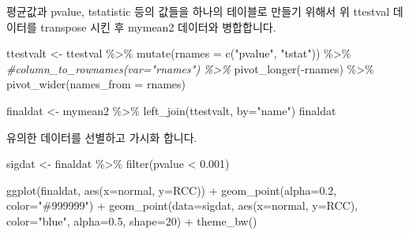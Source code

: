 \documentclass[
]{book}
\newenvironment{Shaded}{\begin{snugshade}}{\end{snugshade}}
\newcommand{\AttributeTok}[1]{\textcolor[rgb]{0.77,0.63,0.00}{#1}}
\newcommand{\CommentTok}[1]{\textcolor[rgb]{0.56,0.35,0.01}{\textit{#1}}}
\newcommand{\DecValTok}[1]{\textcolor[rgb]{0.00,0.00,0.81}{#1}}
\newcommand{\FloatTok}[1]{\textcolor[rgb]{0.00,0.00,0.81}{#1}}
\newcommand{\FunctionTok}[1]{\textcolor[rgb]{0.00,0.00,0.00}{#1}}
\newcommand{\NormalTok}[1]{#1}
\newcommand{\OtherTok}[1]{\textcolor[rgb]{0.56,0.35,0.01}{#1}}
\newcommand{\SpecialCharTok}[1]{\textcolor[rgb]{0.00,0.00,0.00}{#1}}
\newcommand{\StringTok}[1]{\textcolor[rgb]{0.31,0.60,0.02}{#1}}
\begin{document}
평균값과 pvalue, tstatistic 등의 값들을 하나의 테이블로 만들기 위해서 위 ttestval 데이터를 transpose 시킨 후 mymean2 데이터와 병합합니다.

\begin{Shaded}
\begin{Highlighting}[]

\NormalTok{ttestvalt }\OtherTok{\textless{}{-}}\NormalTok{ ttestval }\SpecialCharTok{\%\textgreater{}\%} 
  \FunctionTok{mutate}\NormalTok{(}\AttributeTok{rnames =} \FunctionTok{c}\NormalTok{(}\StringTok{"pvalue"}\NormalTok{, }\StringTok{"tstat"}\NormalTok{)) }\SpecialCharTok{\%\textgreater{}\%} 
  \CommentTok{\#column\_to\_rownames(var="rnames") \%\textgreater{}\% }
  \FunctionTok{pivot\_longer}\NormalTok{(}\SpecialCharTok{{-}}\NormalTok{rnames) }\SpecialCharTok{\%\textgreater{}\%} 
  \FunctionTok{pivot\_wider}\NormalTok{(}\AttributeTok{names\_from =}\NormalTok{ rnames)}

\NormalTok{finaldat }\OtherTok{\textless{}{-}}\NormalTok{ mymean2 }\SpecialCharTok{\%\textgreater{}\%} \FunctionTok{left\_join}\NormalTok{(ttestvalt, }\AttributeTok{by=}\StringTok{"name"}\NormalTok{)}
\NormalTok{finaldat}
\end{Highlighting}
\end{Shaded}

유의한 데이터를 선별하고 가시화 합니다.

\begin{Shaded}
\begin{Highlighting}[]

\NormalTok{sigdat }\OtherTok{\textless{}{-}}\NormalTok{ finaldat }\SpecialCharTok{\%\textgreater{}\%} 
  \FunctionTok{filter}\NormalTok{(pvalue }\SpecialCharTok{\textless{}} \FloatTok{0.001}\NormalTok{)}

\FunctionTok{ggplot}\NormalTok{(finaldat, }\FunctionTok{aes}\NormalTok{(}\AttributeTok{x=}\NormalTok{normal, }\AttributeTok{y=}\NormalTok{RCC)) }\SpecialCharTok{+}
  \FunctionTok{geom\_point}\NormalTok{(}\AttributeTok{alpha=}\FloatTok{0.2}\NormalTok{, }\AttributeTok{color=}\StringTok{"\#999999"}\NormalTok{) }\SpecialCharTok{+}
  \FunctionTok{geom\_point}\NormalTok{(}\AttributeTok{data=}\NormalTok{sigdat, }\FunctionTok{aes}\NormalTok{(}\AttributeTok{x=}\NormalTok{normal, }\AttributeTok{y=}\NormalTok{RCC), }\AttributeTok{color=}\StringTok{"blue"}\NormalTok{, }\AttributeTok{alpha=}\FloatTok{0.5}\NormalTok{, }\AttributeTok{shape=}\DecValTok{20}\NormalTok{) }\SpecialCharTok{+}
  \FunctionTok{theme\_bw}\NormalTok{()}
\end{Highlighting}
\end{Shaded}
\end{document}
